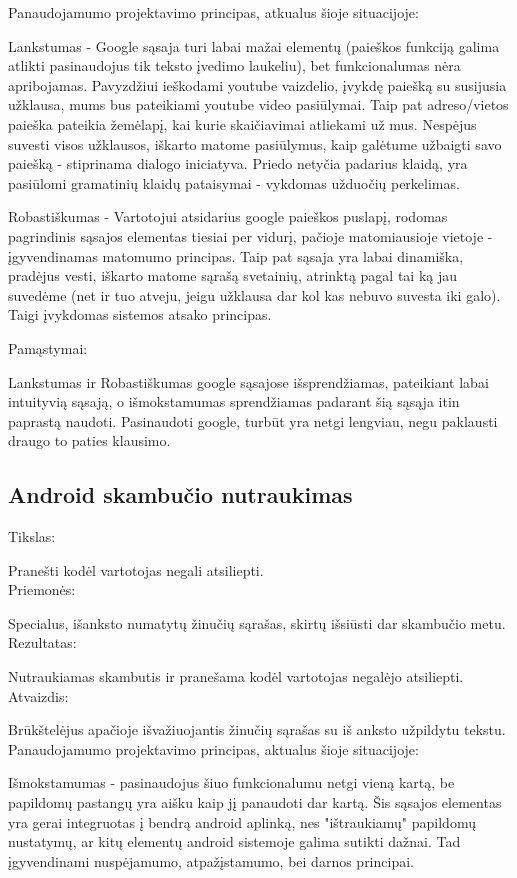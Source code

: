 ﻿\documentclass[a4paper, 12pt]{article}
\begin{document}
		Panaudojamumo projektavimo principas, atkualus šioje situacijoje:

		Lankstumas - Google sąsaja turi labai mažai elementų (paieškos funkciją galima atlikti pasinaudojus tik teksto įvedimo laukeliu), bet funkcionalumas nėra apribojamas.
		Pavyzdžiui ieškodami youtube vaizdelio, įvykdę paiešką su susijusia užklausa, mums bus pateikiami youtube video pasiūlymai.
		Taip pat adreso/vietos paieška pateikia žemėlapį, kai kurie skaičiavimai atliekami už mus.
		Nespėjus suvesti visos užklausos, iškarto matome pasiūlymus, kaip galėtume užbaigti savo paiešką - stiprinama dialogo iniciatyva.
		Priedo netyčia padarius klaidą, yra pasiūlomi gramatinių klaidų pataisymai - vykdomas užduočių perkelimas.

		Robastiškumas - Vartotojui atsidarius google paieškos puslapį, rodomas pagrindinis sąsajos elementas tiesiai per vidurį, pačioje matomiausioje vietoje - įgyvendinamas matomumo principas.
		Taip pat sąsaja yra labai dinamiška, pradėjus vesti, iškarto matome sąrašą svetainių, atrinktą pagal tai ką jau suvedėme (net ir tuo atveju, jeigu užklausa dar kol kas nebuvo suvesta iki galo).
		Taigi įvykdomas sistemos atsako principas.

		Pamąstymai:

		Lankstumas ir Robastiškumas google sąsajose išsprendžiamas, pateikiant labai intuityvią sąsają, o išmokstamumas sprendžiamas padarant šią sąsąja itin paprastą naudoti.
		Pasinaudoti google, turbūt yra netgi lengviau, negu paklausti draugo to paties klausimo.
	\subsection{Android skambučio nutraukimas}
		Tikslas:

		Pranešti kodėl vartotojas negali atsiliepti.\\
		Priemonės:

		Specialus, išanksto numatytų žinučių sąrašas, skirtų išsiūsti dar skambučio metu.\\
		Rezultatas:

		Nutraukiamas skambutis ir pranešama kodėl vartotojas negalėjo atsiliepti.\\
		Atvaizdis:

		Brūkštelėjus apačioje išvažiuojantis žinučių sąrašas su iš anksto užpildytu tekstu.\\

		Panaudojamumo projektavimo principas, aktualus šioje situacijoje:

		Išmokstamumas - pasinaudojus šiuo funkcionalumu netgi vieną kartą, be papildomų pastangų yra aišku kaip jį panaudoti dar kartą.
		Šis sąsajos elementas yra gerai integruotas į bendrą android aplinką, nes "ištraukiamų" papildomų nustatymų, ar kitų elementų android sistemoje galima sutikti dažnai.
		Tad įgyvendinami nuspėjamumo, atpažįstamumo, bei darnos principai.
\end{document}
